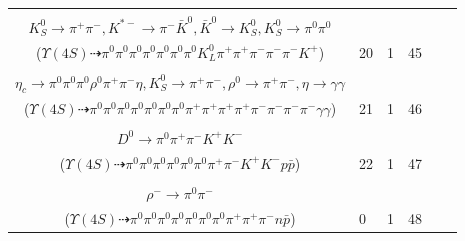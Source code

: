 \documentclass[landscape]{article}
\newcounter{rownumbers}
\newcommand\rn{\stepcounter{rownumbers}\arabic{rownumbers}}
\newcommand{\EOLP}{\\ \hline} %
\newcommand{\topoTags}[1]{#1} %
\begin{document}
\begin{longtable}{clcccc}
\rn & \makecell[l]{ $ 
\Upsilon(4S) \rightarrow B^{0} \bar{B}^{0} ,
B^{0} \rightarrow \pi^{0} \pi^{0} \pi^{+} \pi^{-} \bar{K}^{0} K^{+} D^{-} ,
\bar{B}^{0} \rightarrow \pi^{0} D^{0} ,
\bar{K}^{0} \rightarrow K_{S}^{0} ,
D^{-} \rightarrow K_{L}^{0} K^{*-} ,
D^{0} \rightarrow \pi^{0} \pi^{0} ,
$ \\ $
K_{S}^{0} \rightarrow \pi^{+} \pi^{-} ,
K^{*-} \rightarrow \pi^{-} \bar{K}^{0} ,
\bar{K}^{0} \rightarrow K_{S}^{0} ,
K_{S}^{0} \rightarrow \pi^{0} \pi^{0} 
$ \\ ($
\Upsilon(4S) \dashrightarrow \pi^{0} \pi^{0} \pi^{0} \pi^{0} \pi^{0} \pi^{0} \pi^{0} K_{L}^{0} \pi^{+} \pi^{+} \pi^{-} \pi^{-} \pi^{-} K^{+} 
$) } & \topoTags{20 & }1 & 45 \EOLP

\rn & \makecell[l]{ $ 
\Upsilon(4S) \rightarrow \bar{B}^{0} \bar{B}^{0} ,
\bar{B}^{0} \rightarrow \pi^{0} D^{0} ,
\bar{B}^{0} \rightarrow \omega \bar{K}^{0} \eta_{c} ,
D^{0} \rightarrow \pi^{0} \pi^{0} ,
\omega \rightarrow \pi^{0} \pi^{+} \pi^{-} ,
\bar{K}^{0} \rightarrow K_{S}^{0} ,
$ \\ $
\eta_{c} \rightarrow \pi^{0} \pi^{0} \pi^{0} \rho^{0} \pi^{+} \pi^{-} \eta ,
K_{S}^{0} \rightarrow \pi^{+} \pi^{-} ,
\rho^{0} \rightarrow \pi^{+} \pi^{-} ,
\eta \rightarrow \gamma \gamma 
$ \\ ($
\Upsilon(4S) \dashrightarrow \pi^{0} \pi^{0} \pi^{0} \pi^{0} \pi^{0} \pi^{0} \pi^{0} \pi^{+} \pi^{+} \pi^{+} \pi^{+} \pi^{-} \pi^{-} \pi^{-} \pi^{-} \gamma \gamma 
$) } & \topoTags{21 & }1 & 46 \EOLP

\rn & \makecell[l]{ $ 
\Upsilon(4S) \rightarrow B^{0} \bar{B}^{0} ,
B^{0} \rightarrow \pi^{0} \bar{D}^{0} ,
\bar{B}^{0} \rightarrow D^{*0} p \bar{\Delta}^{+} ,
\bar{D}^{0} \rightarrow \pi^{0} \pi^{0} ,
D^{*0} \rightarrow \pi^{0} D^{0} ,
\bar{\Delta}^{+} \rightarrow \pi^{0} \bar{p} ,
$ \\ $
D^{0} \rightarrow \pi^{0} \pi^{+} \pi^{-} K^{+} K^{-} 
$ \\ ($
\Upsilon(4S) \dashrightarrow \pi^{0} \pi^{0} \pi^{0} \pi^{0} \pi^{0} \pi^{0} \pi^{+} \pi^{-} K^{+} K^{-} p \bar{p} 
$) } & \topoTags{22 & }1 & 47 \EOLP

\rn & \makecell[l]{ $ 
\Upsilon(4S) \rightarrow B^{0} \bar{B}^{0} ,
B^{0} \rightarrow \pi^{0} \bar{D}^{0} ,
\bar{B}^{0} \rightarrow \pi^{0} \rho^{+} \rho^{+} \rho^{-} n \bar{p} ,
\bar{D}^{0} \rightarrow \pi^{0} \pi^{0} ,
\rho^{+} \rightarrow \pi^{0} \pi^{+} ,
\rho^{+} \rightarrow \pi^{0} \pi^{+} ,
$ \\ $
\rho^{-} \rightarrow \pi^{0} \pi^{-} 
$ \\ ($
\Upsilon(4S) \dashrightarrow \pi^{0} \pi^{0} \pi^{0} \pi^{0} \pi^{0} \pi^{0} \pi^{0} \pi^{+} \pi^{+} \pi^{-} n \bar{p} 
$) } & \topoTags{0 & }1 & 48 \EOLP


\end{longtable}
\end{document}
